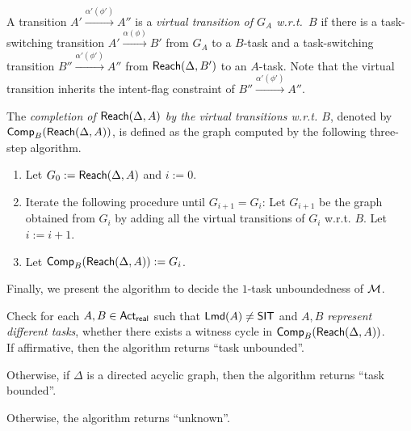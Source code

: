 
A transition $A' \xrightarrow{\alpha'(\phi')} A''$ is a \emph{virtual transition of $G_A$ w.r.t.\ $B$} if there is a task-switching transition $A' \xrightarrow{\alpha(\phi)} B'$ from $G_A$ to a $B$-task and a task-switching transition $B'' \xrightarrow{\alpha'(\phi')} A''$ from ${\sf Reach}(\Delta, B')$ to an $A$-task. Note that the virtual transition inherits the intent-flag constraint of $B'' \xrightarrow{\alpha'(\phi')} A''$.

The \emph{completion of ${\sf Reach}(\Delta, A)$ by the virtual transitions w.r.t. $B$},  denoted by ${\sf Comp}_B({\sf Reach}(\Delta, A))$, is defined as the graph computed by the following three-step algorithm.
\begin{enumerate}
	\item Let $G_0 := {\sf Reach}(\Delta, A)$ and $i:=0$. 
	\item Iterate the following procedure until $G_{i+1} = G_i$: Let $G_{i+1}$ be the graph obtained from $G_i$ by adding all the virtual transitions of $G_i$ w.r.t. $B$. Let $i:=i+1$. 
	\item Let ${\sf Comp}_B({\sf Reach}(\Delta, A)):=G_i$.
\end{enumerate}

Finally, we present the algorithm to decide the $1$-task unboundedness of $\Mm$.
%
\begin{tcolorbox}[width=1.0\linewidth, title={Algorithm to decide the $1$-task unboundedness of $\Mm$}]
Check for each $A, B \in {\sf Act}_{\sf real}$ such that  ${\sf Lmd}(A) \neq {\sf SIT}$ and $A,B$ \emph{represent different tasks}, whether there exists 
a witness cycle %
in ${\sf Comp}_B({\sf Reach}(\Delta, A))$. \\
%
If %
affirmative, then the algorithm returns ``task unbounded''. 

Otherwise, if 
$\Delta$ is a directed acyclic graph, then the algorithm returns ``task bounded''. 

Otherwise, the algorithm returns ``unknown''.
\end{tcolorbox}


